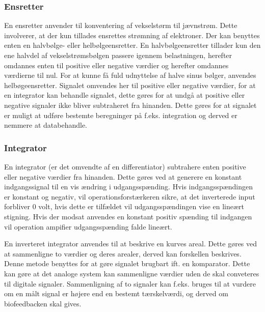 \subsubsection{Ensretter}
En ensretter anvender til konventering af vekselstørm til jævnstrøm. Dette involverer, at der kun tillades ensrettes strømning af elektroner. Der kan benyttes enten en halvbølge- eller helbølgeensretter. En halvbølgeensretter tillader kun den ene halvdel af vekselstrømsbølgen passere igennem belastningen, herefter omdannes enten til positive eller negative værdier og herefter omdannes værdierne til nul.
For at kunne få fuld udnyttelse af halve sinus bølger, anvendes helbøgeensretter. Signalet omvendes her til positive eller negative værdier, for at en integrator kan behandle signalet, dette gøres for at undgå at positive eller negative signaler ikke bliver subtraheret fra hinanden. \cite{EEtech2003} Dette gøres for at signalet er muligt at udføre bestemte beregninger på f.eks. integration og derved er nemmere at databehandle.  

\subsubsection{Integrator}
En integrator (er det omvendte af en differentiator) subtrahere enten positive eller negative værdier fra hinanden. Dette gøres ved at generere en konstant indgangssignal til en vis ændring i udgangsspænding. Hvis indgangsspændingen er konstant og negativ, vil operationsforstærkeren sikre, at det inverterede input forbliver 0 volt, hvis dette er tilfældet vil udgangsspændingen vise en lineært stigning. Hvis der modsat anvendes en konstant positiv spænding til indgangen vil operation ampifier udgangsspænding falde lineært. \cite{EEtech2003}

En inverteret integrator anvendes til at beskrive en kurves areal. Dette gøres ved at sammenligne to værdier og deres arealer, derved kan forskellen beskrives. Denne metode benyttes for at gøre signalet brugbart ift. en komparator. Dette kan gøre at det analoge system kan sammenligne værdier uden de skal conveteres til digitale signaler. Sammenligning af to signaler kan f.eks. bruges til at vurdere om en målt signal er højere end en bestemt tærskelværdi, og derved om biofeedbacken skal gives. 


